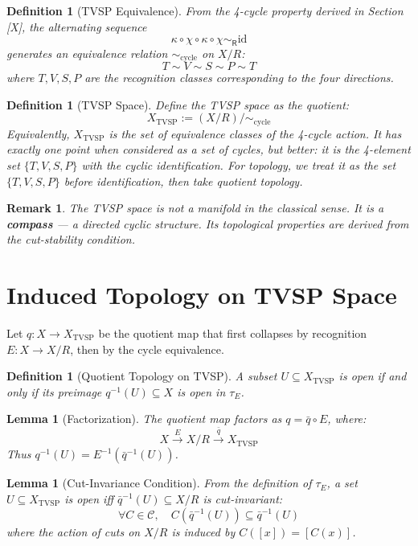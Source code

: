 \documentclass[12pt]{article}
\newtheorem{definition}[axiom]{Definition}
\newtheorem{lemma}[axiom]{Lemma}
\newtheorem{remark}[axiom]{Remark}
\newcommand{\rec}{\mathsf{R}}
\begin{document}
\begin{definition}[TVSP Equivalence]
From the 4-cycle property derived in Section [X], the alternating sequence
\[
\kappa \circ \chi \circ \kappa \circ \chi \sim_{\rec} \text{id}
\]
generates an equivalence relation \(\sim_{\text{cycle}}\) on \(X/R\):
\[
T \sim V \sim S \sim P \sim T
\]
where \(T, V, S, P\) are the recognition classes corresponding to the four directions.
\end{definition}

\begin{definition}[TVSP Space]
Define the TVSP space as the quotient:
\[
X_{\text{TVSP}} := (X/R) / \sim_{\text{cycle}}
\]
Equivalently, \(X_{\text{TVSP}}\) is the set of equivalence classes of the 4-cycle action.
It has exactly one point when considered as a set of cycles, but better: it is the 4-element set \(\{T, V, S, P\}\) with the cyclic identification. For topology, we treat it as the set \(\{T, V, S, P\}\) before identification, then take quotient topology.
\end{definition}

\begin{remark}
The TVSP space is not a manifold in the classical sense. It is a \textbf{compass} — a directed cyclic structure. Its topological properties are derived from the cut-stability condition.
\end{remark}

\section{Induced Topology on TVSP Space}

Let \(q: X \to X_{\text{TVSP}}\) be the quotient map that first collapses by recognition \(E: X \to X/R\), then by the cycle equivalence.

\begin{definition}[Quotient Topology on TVSP]
A subset \(U \subseteq X_{\text{TVSP}}\) is open if and only if its preimage \(q^{-1}(U) \subseteq X\) is open in \(\tau_E\).
\end{definition}

\begin{lemma}[Factorization]
The quotient map factors as \(q = \bar{q} \circ E\), where:
\[
X \xrightarrow{E} X/R \xrightarrow{\bar{q}} X_{\text{TVSP}}
\]
Thus \(q^{-1}(U) = E^{-1}(\bar{q}^{-1}(U))\).
\end{lemma}

\begin{lemma}[Cut-Invariance Condition]
From the definition of \(\tau_E\), a set \(U \subseteq X_{\text{TVSP}}\) is open iff \(\bar{q}^{-1}(U) \subseteq X/R\) is cut-invariant:
\[
\forall C \in \mathcal{C}, \quad C(\bar{q}^{-1}(U)) \subseteq \bar{q}^{-1}(U)
\]
where the action of cuts on \(X/R\) is induced by \(C([x]) = [C(x)]\).
\end{lemma}
\end{document}
